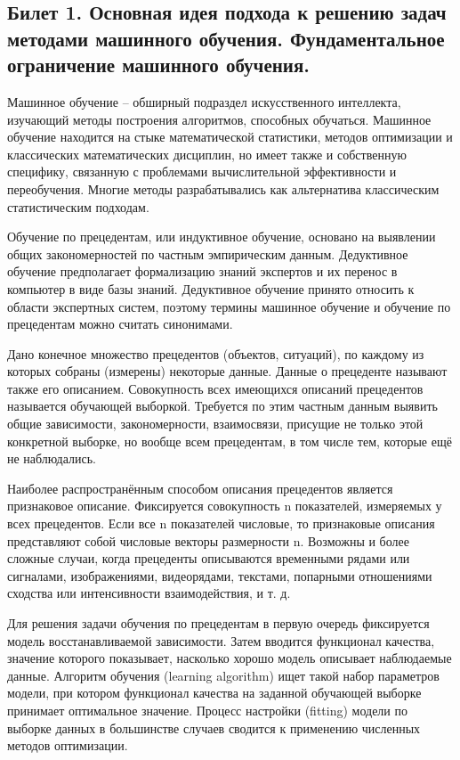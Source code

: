 \documentclass[a4paper, 12pt]{article}
\begin{document}
	\subsection*{Билет 1. Основная идея подхода к решению задач методами машинного обучения. Фундаментальное ограничение машинного обучения.}
	Машинное обучение -- обширный подраздел искусственного интеллекта, изучающий методы построения алгоритмов, способных обучаться. Машинное обучение находится на стыке математической статистики, методов оптимизации и классических математических дисциплин, но имеет также и собственную специфику, связанную с проблемами вычислительной эффективности и переобучения. Многие методы разрабатывались как альтернатива классическим статистическим подходам. 
	
	Обучение по прецедентам, или индуктивное обучение, основано на выявлении общих закономерностей по частным эмпирическим данным. Дедуктивное обучение предполагает формализацию знаний экспертов и их перенос в компьютер в виде базы знаний. Дедуктивное обучение принято относить к области экспертных систем, поэтому термины машинное обучение и обучение по прецедентам можно считать синонимами.
	
	Дано конечное множество прецедентов (объектов, ситуаций), по каждому из которых собраны (измерены) некоторые данные. Данные о прецеденте называют также его описанием. Совокупность всех имеющихся описаний прецедентов называется обучающей выборкой. Требуется по этим частным данным выявить общие зависимости, закономерности, взаимосвязи, присущие не только этой конкретной выборке, но вообще всем прецедентам, в том числе тем, которые ещё не наблюдались.
	
	Наиболее распространённым способом описания прецедентов является признаковое описание. Фиксируется совокупность n показателей, измеряемых у всех прецедентов. Если все n показателей числовые, то признаковые описания представляют собой числовые векторы размерности n. Возможны и более сложные случаи, когда прецеденты описываются временными рядами или сигналами, изображениями, видеорядами, текстами, попарными отношениями сходства или интенсивности взаимодействия, и т. д.
	
	Для решения задачи обучения по прецедентам в первую очередь фиксируется модель восстанавливаемой зависимости. Затем вводится функционал качества, значение которого показывает, насколько хорошо модель описывает наблюдаемые данные. Алгоритм обучения (learning algorithm) ищет такой набор параметров модели, при котором функционал качества на заданной обучающей выборке принимает оптимальное значение. Процесс настройки (fitting) модели по выборке данных в большинстве случаев сводится к применению численных методов оптимизации.
	
\end{document}
